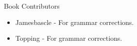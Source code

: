 \large Book Contributors \newline
\begin{itemize}
	\item Jamesbascle - For grammar corrections.
	\item Topping - For grammar corrections.
\end{itemize}

\newpage